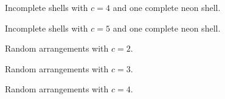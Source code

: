 \begin{figure}[h]
    \centering
    
    \caption{Incomplete shells with $c=4$ and one complete neon shell.}
    \label{incompl00-core01}
\end{figure}

\begin{figure}
    \centering
    
    \caption{Incomplete shells with $c=5$ and one complete neon shell.}
    \label{incompl01-core05}
\end{figure}



\begin{figure}[h]
    \centering
    
    \caption{Random arrangements with $c=2$.}
    \label{random-core02}
\end{figure}

\begin{figure}
    \centering
    
    \caption{Random arrangements with $c=3$.}
    \label{random-core03}
\end{figure}

\begin{figure}[h]
    \centering
    
    \caption{Random arrangements with $c=4$.}
    \label{random-core04}
\end{figure}
